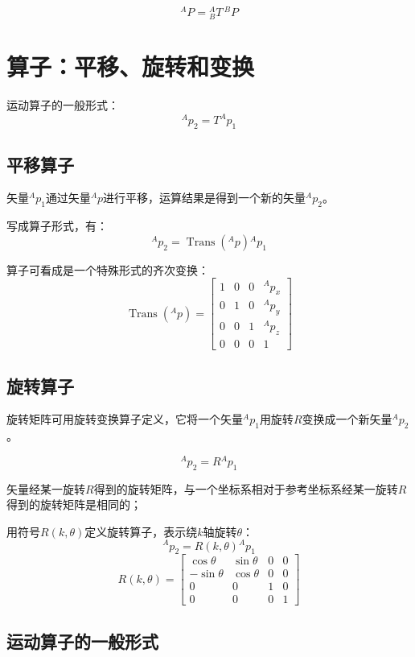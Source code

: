 $$
    {}^{A} P = {}^{A}_{B} T \, {}^{B} P
$$

\section{算子：平移、旋转和变换}


运动算子的一般形式：
$$
{}^Ap_2=T^Ap_1
$$

\subsection{平移算子}

矢量${}^A p_1$通过矢量${}^A p$进行平移，运算结果是得到一个新的矢量${}^A p_2$。

写成算子形式，有：
$$
{}^A p_2=\operatorname{Trans}\left({}^A p\right){}^A p_1
$$

算子可看成是一个特殊形式的齐次变换：
$$
\operatorname{Trans}\left({}^A p\right)=
\begin{bmatrix}
    1 & 0 & 0 & {}^A p_x\\
    0 & 1 & 0 & {}^A p_y\\
    0 & 0 & 1 & {}^A p_z\\
    0 & 0 & 0 & 1
\end{bmatrix}
$$

\subsection{旋转算子}

旋转矩阵可用旋转变换算子定义，它将一个矢量${}^A p_1$用旋转$R$变换成一个新矢量${}^A p_2$。

$$
{}^A p_2=R{}^A p_1
$$

矢量经某一旋转$R$得到的旋转矩阵，与一个坐标系相对于参考坐标系经某一旋转$R$得到的旋转矩阵是相同的；

用符号$R\left(k, \theta\right)$定义旋转算子，表示绕$k$轴旋转$\theta$：
$$
{}^A p_2=R\left(k, \theta\right){}^A p_1
$$
$$
R\left(k, \theta\right)=
\begin{bmatrix}
    \cos\theta & \sin\theta & 0 & 0\\
    -\sin\theta & \cos\theta & 0 & 0\\
    0 & 0 & 1 & 0 \\
    0 & 0 & 0 & 1
\end{bmatrix}
$$

\subsection{运动算子的一般形式}

